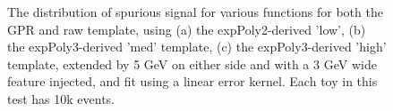 \begin{figure} 
\begin{center}

\caption{The distribution of spurious signal for various functions for both the GPR and raw template, using (a) the expPoly2-derived 'low', (b) the expPoly3-derived 'med' template, (c) the expPoly3-derived 'high' template, extended by 5 GeV on either side and with a 3 GeV wide feature injected, and fit using a linear error kernel. Each toy in this test has 10k events.}
\label{fig:linearkernel_lowpt_10k_Sig_1s}
\end{center}
\end{figure}


